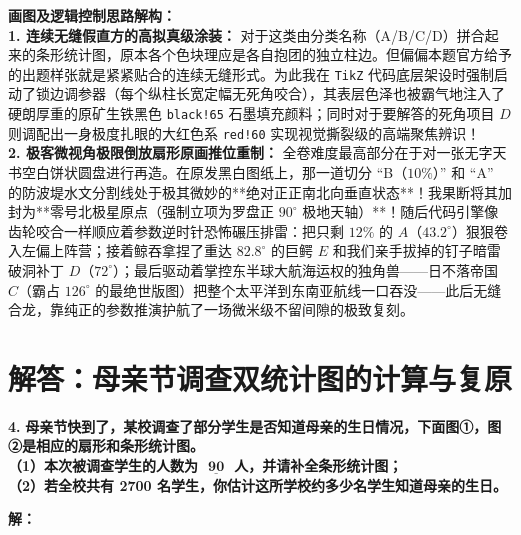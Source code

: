 \vspace{0.6cm}

{\small\color{blue!70!black}
\textbf{画图及逻辑控制思路解构：}\\
\textbf{1. 连续无缝假直方的高拟真级涂装：} 对于这类由分类名称（A/B/C/D）拼合起来的条形统计图，原本各个色块理应是各自抱团的独立柱边。但偏偏本题官方给予的出题样张就是紧紧贴合的连续无缝形式。为此我在 \texttt{TikZ} 代码底层架设时强制启动了锁边调参器（每个纵柱长宽定幅无死角咬合），其表层色泽也被霸气地注入了硬朗厚重的原矿生铁黑色 \texttt{black!65} 石墨填充颜料；同时对于要解答的死角项目 $D$ 则调配出一身极度扎眼的大红色系 \texttt{red!60} 实现视觉撕裂级的高端聚焦辨识！\\
\textbf{2. 极客微视角极限倒放扇形原画推位重制：} 全卷难度最高部分在于对一张无字天书空白饼状圆盘进行再造。在原发黑白图纸上，那一道切分 “B（$10\%$）” 和 “A” 的防波堤水文分割线处于极其微妙的**绝对正正南北向垂直状态**！我果断将其加封为**零号北极星原点（强制立项为罗盘正 $90^\circ$ 极地天轴）**！随后代码引擎像齿轮咬合一样顺应着参数逆时针恐怖碾压排雷：把只剩 $12\%$ 的 $A$（$43.2^\circ$）狠狠卷入左偏上阵营；接着鲸吞拿捏了重达 $82.8^\circ$ 的巨鳄 $E$ 和我们亲手拔掉的钉子暗雷破洞补丁 $D$（$72^\circ$）；最后驱动着掌控东半球大航海运权的独角兽——日不落帝国 $C$（霸占 $126^\circ$ 的最绝世版图）把整个太平洋到东南亚航线一口吞没——此后无缝合龙，靠纯正的参数推演护航了一场微米级不留间隙的极致复刻。
}

\newpage



\newpage

\section{解答：母亲节调查双统计图的计算与复原}

\vspace{0.6cm}

\textbf{\LARGE 4.} \textbf{母亲节快到了，某校调查了部分学生是否知道母亲的生日情况，下面图①，图②是相应的扇形和条形统计图。\\
（1）本次被调查学生的人数为 $\underline{\textbf{    90    }}$ 人，并请补全条形统计图；\\
（2）若全校共有 2700 名学生，你估计这所学校约多少名学生知道母亲的生日。}

\vspace{0.4cm}
\textbf{解：}

